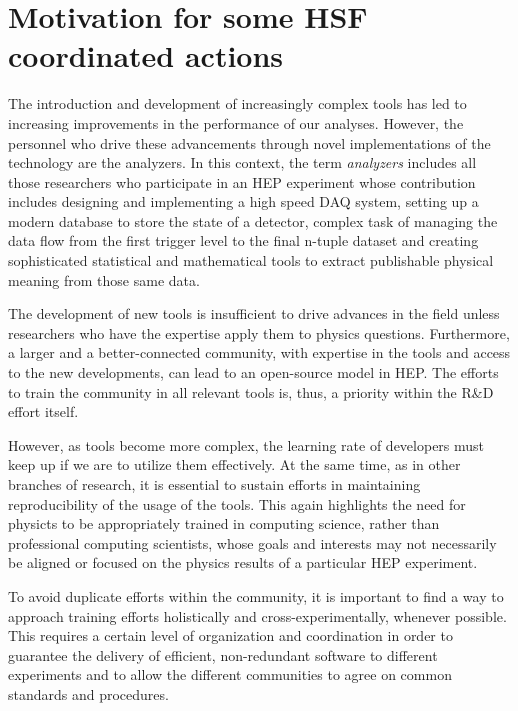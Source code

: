 \documentclass[12pt,a4paper]{article}
\begin{document}
\section{Motivation for some HSF coordinated actions}


The introduction and development of increasingly complex tools has led to
increasing improvements in the performance of our analyses. However, the
personnel who drive these advancements through novel implementations of the
technology are the analyzers. In this context, the term {\it analyzers} includes
all those researchers who participate in an HEP experiment whose contribution
includes designing and implementing a high speed DAQ system, setting up a modern
database to store the state of a detector, complex task of managing the data
flow from the first trigger level to the final n-tuple dataset and creating
sophisticated statistical and mathematical tools to extract publishable physical
meaning from those same data.

The development of new tools is insufficient to drive advances in the field
unless researchers who have the expertise apply them to physics questions.
Furthermore, a larger and a better-connected community, with expertise in the
tools and access to the new developments, can lead to an open-source model in
HEP. The efforts to train the community in all relevant tools is, thus, a
priority within the R\&D effort itself.

However, as tools become more complex, the learning rate of developers must keep
up if we are to utilize them effectively.  At the same time, as in other
branches of research, it is essential to sustain efforts in maintaining
reproducibility of the usage of the tools. This again highlights the need for
physicts to be appropriately trained in computing science, rather than
professional computing scientists, whose goals and interests may not necessarily
be aligned or focused on the physics results of a particular HEP experiment.

To avoid duplicate efforts within the community, it is important to find a way
to approach training efforts holistically and cross-experimentally, whenever
possible. This requires a certain level of organization and coordination in
order to guarantee the delivery of efficient, non-redundant software to
different experiments and to allow the different communities to agree on common
standards and procedures.
\end{document}
